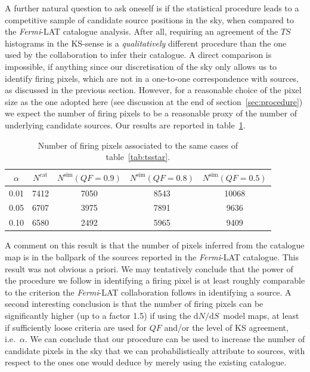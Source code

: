 \documentclass{article}
\def\dNdS{\textrm{d}N/\textrm{d}S}
\newcommand{\Fermi}{\textit{Fermi}}
\begin{document}
A further natural question to ask oneself is if the statistical procedure leads to a competitive sample of candidate source positions in the sky, when compared to the \Fermi-LAT catalogue analysis. After all, requiring an agreement of the $TS$ histograms in the KS-sense is a \textit{qualitatively} different procedure than the one used by the collaboration to infer their catalogue. 
A direct comparison is impossible, if anything since our discretisation of the sky only allows us to identify firing pixels, which are not in a one-to-one correspondence with sources, as discussed in the previous section. However, for a reasonable choice of the pixel size as the one adopted here (see discussion at the end of section~\ref{sec:procedure}) we expect the number of  firing pixels to be a reasonable proxy of the number of underlying candidate sources. Our results are reported in table~\ref{tab:number_firing}.
\begin{table}[!h]
    \renewcommand{\arraystretch}{1.2}
    \centering
    \begin{tabular}{c|c|c|c|c}   
        $\alpha$ & $N^\textrm{cat}$ & $N^\textrm{sim}(QF=0.9)$& $N^\textrm{sim}(QF=0.8)$& $N^\textrm{sim}(QF=0.5)$\\
        \hline 
       0.01 & 7412 & 7050 & 8543  & 10068\\
        \hline 
       0.05 & 6707 & 3975 & 7891  & 9636\\
        \hline 
       0.10 & 6580 & 2492 & 5965  & 9409\\
    \end{tabular}
\caption{Number of firing pixels associated to the same cases of table~\ref{tab:tsstar}.}  
\label{tab:number_firing}
\end{table}

A comment on this result is that the number of pixels inferred from the catalogue map is in the ballpark of the sources reported in the \Fermi-LAT catalogue. This result was not obvious a priori. We may tentatively conclude that the power of the procedure we follow in identifying a firing pixel  is at least roughly comparable to the criterion the \Fermi-LAT collaboration follows in identifying a source. 
A second interesting conclusion is that the number of firing pixels can be significantly higher (up to a factor 1.5) if using the $\dNdS$~model maps, at least if sufficiently loose criteria are used for $QF$ and/or the level of KS agreement, i.e.~$\alpha$. We can conclude  that our procedure can be used to increase the number of candidate pixels in the sky that we can probabilistically attribute to sources, with respect to the ones one would deduce by merely using the existing catalogue.   
\end{document}
